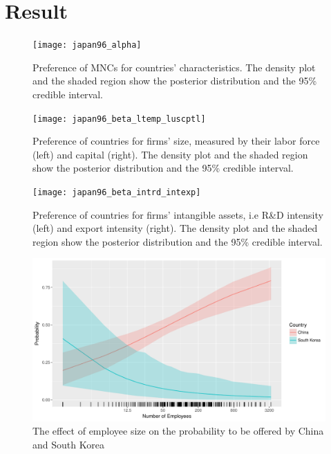 \section{Result}
\label{sec:result}

\begin{figure}[!ht] \centering
\texttt{[image: japan96\_alpha]}
  \caption{Preference of MNCs for countries' characteristics. The density plot
and the shaded region show the posterior distribution and the 95\% credible
interval.}
  \label{fig:japan96_alpha}
\end{figure}

\begin{figure}[!ht] \centering
\texttt{[image: japan96\_beta\_ltemp\_luscptl]}
  \caption{Preference of countries for firms' size, measured by their labor
force (left) and capital (right). The density plot and the shaded region show
the posterior distribution and the 95\% credible interval.}
  \label{fig:japan96_beta_ltemp_luscptl}
\end{figure}

\begin{figure}[!ht] \centering
\texttt{[image: japan96\_beta\_intrd\_intexp]}
  \caption{Preference of countries for firms' intangible assets, i.e R\&D
intensity (left) and export intensity (right). The density plot and the shaded
region show the posterior distribution and the 95\% credible interval.}
  \label{fig:japan96_beta_intrd_intexp}
\end{figure}

\begin{figure}[!ht]
  \centering
  \includegraphics[width=\textwidth,keepaspectratio]{../figure/japan96_effect_of_temp}
  \caption{The effect of employee size on the probability to be offered by China
    and South Korea}
  \label{fig:japan96_effect_of_temp}
\end{figure}

